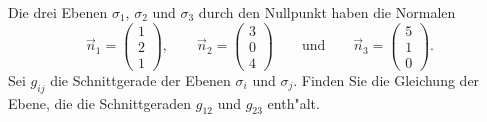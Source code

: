 Die drei Ebenen $\sigma_1$, $\sigma_2$ und $\sigma_3$ durch den Nullpunkt
haben die Normalen
\[
\vec n_1=
\begin{pmatrix}1\\2\\1\end{pmatrix},
\qquad
\vec n_2=
\begin{pmatrix}3\\0\\4\end{pmatrix}
\qquad\text{und}\qquad
\vec n_3=
\begin{pmatrix}5\\1\\0\end{pmatrix}.
\]
Sei $g_{ij}$ die Schnittgerade der Ebenen $\sigma_i$ und $\sigma_j$.
Finden Sie die Gleichung der Ebene, die die Schnittgeraden $g_{12}$
und $g_{23}$ enth"alt.

